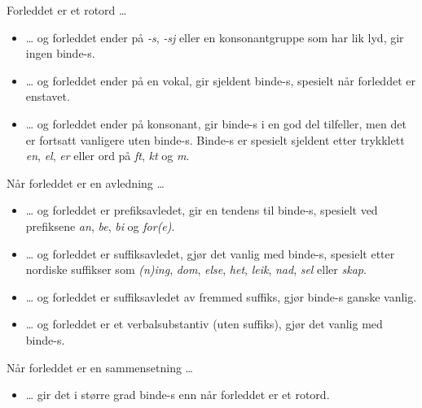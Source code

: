 \begin{items}
	\item Forleddet er et rotord …
	\begin{itemize}
		\item … og forleddet ender på \textit{-s}, \textit{-sj} eller en konsonantgruppe som har lik lyd, gir ingen binde-s.
		
		
		\item … og forleddet ender på en vokal, gir sjeldent binde-s, spesielt når forleddet er enstavet.
		
		
		\item … og forleddet ender på konsonant, gir binde-s i en god del tilfeller, men det er fortsatt vanligere uten binde-s. Binde-s er spesielt sjeldent etter trykklett \textit{en}, \textit{el}, \textit{er} eller ord på \textit{ft}, \textit{kt} og \textit{m}.
		
		
	\end{itemize}
	
	\item Når forleddet er en avledning …
	\begin{itemize}
		\item … og forleddet er prefiksavledet, gir en tendens til binde-s, spesielt ved prefiksene \textit{an}, \textit{be}, \textit{bi} og \textit{for(e)}.
		
		
		\item … og forleddet er suffiksavledet, gjør det vanlig med binde-s, spesielt etter nordiske suffikser som \textit{(n)ing}, \textit{dom}, \textit{else}, \textit{het}, \textit{leik}, \textit{nad}, \textit{sel} eller \textit{skap}.
		
		
		\item … og forleddet er suffiksavledet av fremmed suffiks, gjør binde-s ganske vanlig. 
		
		
		\item … og forleddet er et verbalsubstantiv (uten suffiks), gjør det vanlig med binde-s. 
		
	\end{itemize}
	
	\item Når forleddet er en sammensetning …
	\begin{itemize}
		\item … gir det i større grad binde-s enn når forleddet er et rotord.
	

\end{itemize}
\end{items}
